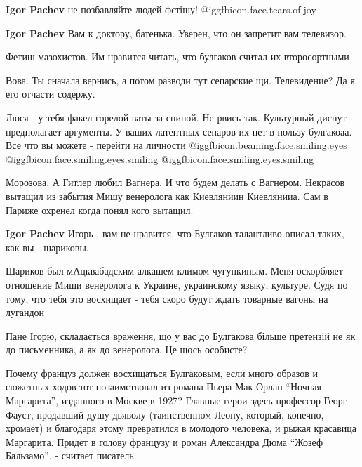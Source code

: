 \begin{itemize}
\begin{itemize}
\textbf{Igor Pachev} не позбавляйте людей фєтішу!  @igg{fbicon.face.tears.of.joy} 

\textbf{Igor Pachev} Вам к доктору, батенька. Уверен, что он запретит вам телевизор.

Фетиш мазохистов. Им нравится читать, что булгаков считал их второсортными

Вова. Ты сначала вернись, а потом разводи тут сепарские щи. Телевидение? Да я его отчасти содержу.


Люся - у тебя факел горелой ваты за спиной. Не рвись так. Культурный диспут
предполагает аргументы. У ваших латентных сепаров их нет в пользу булгакоаа.
Все что вы можете - перейти на личности  @igg{fbicon.beaming.face.smiling.eyes}   @igg{fbicon.face.smiling.eyes.smiling}   @igg{fbicon.face.smiling.eyes.smiling} 



Морозова. А Гитлер любил Вагнера. И что будем делать с Вагнером. Некрасов
вытащил из забытия Мишу венеролога как Киевляниин Киевлянииа. Сам в Париже
охренел когда понял кого вытащил.

\textbf{Igor Pachev} Игорь , вам не нравится, что Булгаков талантливо описал таких, как вы - шариковы.


Шариков был мАцквабадским алкашем климом чугункиным. Меня оскорбляет отношение
Миши венеролога к Украине, украинскому языку, культуре. Судя по тому, что тебя
это восхищает - тебя скоро будут ждать товарные вагоны на лугандон



Пане Ігорю, складається враження, що у вас до Булгакова більше претензій не як
до письменника, а як до венеролога. Це щось особисте?

\end{itemize} %


Почему француз должен восхищаться Булгаковым, если много образов и сюжетных
ходов тот позаимствовал из романа Пьера Мак Орлан \enquote{Ночная Маргарита}, изданного
в Москве в 1927? Главные герои здесь профессор Георг Фауст, продавший душу
дьяволу (таинственном Леону, который, конечно, хромает) и благодаря этому
превратился в молодого человека, и рыжая красавица Маргарита. Придет в голову
французу и роман Александра Дюма \enquote{Жозеф Бальзамо}, - считает писатель.


\end{itemize}
